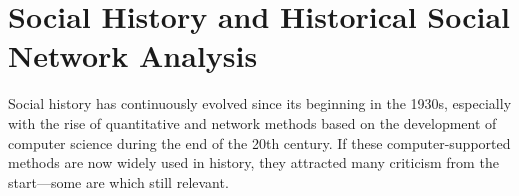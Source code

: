 \section{Social History and Historical Social Network Analysis}


Social history has continuously evolved since its beginning in the 1930s, especially with the rise of quantitative and network methods based on the development of computer science during the end of the 20th century.
If these computer-supported methods are now widely used in history\cite{kerschbaumerPowerNetworksProspects2015, petzCombiningNetworkResearch2022}, they attracted many criticism from the start---some are which still relevant.



